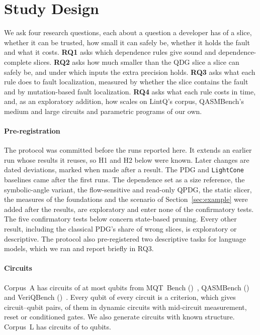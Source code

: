 \section{Study Design}\label{sec:design}

We ask four research questions, each about a question a developer has of a slice, whether it can be
trusted, how small it can safely be, whether it holds the fault and what it costs.
\textbf{RQ1} asks which dependence rules give sound and dependence-complete slices.
\textbf{RQ2} asks how much smaller than the QDG slice a slice can safely be, and under which inputs the
extra precision holds.
\textbf{RQ3} asks what each rule does to fault localization, measured by whether the slice contains
the fault and by mutation-based fault localization.
\textbf{RQ4} asks what each rule costs in time, and, as an exploratory addition, how \tool{} scales on
LintQ's corpus, QASMBench's medium and large circuits and parametric programs of our own.

\paragraph*{Pre-registration}
The protocol was committed before the runs reported here. It extends an earlier run whose results it
reuses, so H1 and H2 below were known. Later changes are dated deviations, marked when made after a result.
The PDG and \texttt{LightCone} baselines came after the first runs. The dependence set as a size reference, the symbolic-angle variant, the
flow-sensitive and read-only QPDG, the static slicer, the measures of the foundations and the scenario of Section~\ref{sec:example} were
added after the results, are exploratory and enter none of the confirmatory tests. The five confirmatory
tests below concern state-based pruning. Every other result, including the classical PDG's share of wrong
slices, is exploratory or descriptive. The protocol also pre-registered two descriptive tasks for language
models, which we ran and report briefly in RQ3.

\paragraph*{Circuits}
Corpus~A has \numNCircuits{} circuits of at most \numMaxQubits{} qubits from MQT~Bench
(\numCircuitsMqt{})~\cite{quetschlich2023mqt}, QASMBench (\numCircuitsQasm{})~\cite{li2023qasmbench} and
VeriQBench (\numCircuitsVeriq{})~\cite{chen2022veriqbench}. Every qubit of every circuit is a criterion,
which gives \numNPairs{} circuit--qubit pairs, \numNDynamicPairs{} of them in dynamic circuits with
mid-circuit measurement, reset or conditioned gates. We also generate
\numFamCircuits{} circuits with known structure. Corpus~L has
\numCorpusLCircuits{} circuits of \numCorpusLMinQubits{} to \numCorpusLMaxQubits{} qubits.

